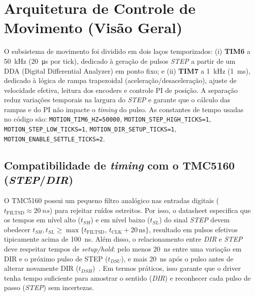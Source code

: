 \FloatBarrier
\section{Arquitetura de Controle de Movimento (Vis\~ao Geral)}
\label{sec:ctrl-visao-geral}

O subsistema de movimento foi dividido em dois la\c{c}os temporizados:
(i) \textbf{TIM6} a \SI{50}{kHz} (\SI{20}{\micro\second} por tick), dedicado \`a gera\c{c}\~ao de pulsos \emph{STEP} a partir de um DDA (Digital Differential Analyzer) em ponto fixo; e
(ii) \textbf{TIM7} a \SI{1}{kHz} (\SI{1}{ms}), dedicado \`a l\'ogica de rampa trapezoidal (acelera\c{c}\~ao/desacelera\c{c}\~ao), ajuste de velocidade efetiva, leitura dos encoders e controle PI de posi\c{c}\~ao.
A separa\c{c}\~ao reduz varia\c{c}\~oes temporais na largura do \emph{STEP} e garante que o c\'alculo das rampas e do PI n\~ao impacte o \emph{timing} do pulso. As constantes de tempo usadas no c\'odigo s\~ao:
\texttt{MOTION\_TIM6\_HZ=50000}, \texttt{MOTION\_STEP\_HIGH\_TICKS=1}, \texttt{MOTION\_STEP\_LOW\_TICKS=1}, \texttt{MOTION\_DIR\_SETUP\_TICKS=1}, \texttt{MOTION\_ENABLE\_SETTLE\_TICKS=2}.

\subsection{Compatibilidade de \emph{timing} com o TMC5160 (\emph{STEP}/\emph{DIR})}
\label{subsec:tmc-step-dir}

O TMC5160 possui um pequeno filtro anal\'ogico nas entradas digitais
(\(t_{\text{FILTSD}}\approx\SI{20}{ns}\)) para rejeitar ru\'idos estreitos. Por
isso, o datasheet especifica que os tempos em n\'ivel alto (\(t_{SH}\)) e em
n\'ivel baixo (\(t_{SL}\)) do sinal \emph{STEP} devem obedecer
\(t_{SH},t_{SL} \ge \max\{t_{\text{FILTSD}},\,t_{\text{CLK}}+20\,\text{ns}\}\),
resultado em pulsos efetivos tipicamente acima de \SI{100}{ns}. Al\'em
disso, o relacionamento entre \emph{DIR} e \emph{STEP} deve respeitar tempos
de \emph{setup/hold}: pelo menos \SI{20}{ns} entre uma varia\c{c}\~ao em DIR e o
pr\'oximo pulso de STEP (\(t_{DSU}\)), e mais \SI{20}{ns} ap\'os o pulso antes
de alterar novamente DIR (\(t_{DSH}\))~\cite{tmc5160_ds}. Em termos pr\'aticos,
isso garante que o driver tenha tempo suficiente para amostrar o sentido
(\emph{DIR}) e reconhecer cada pulso de passo (\emph{STEP}) sem incertezas.

